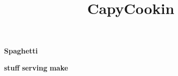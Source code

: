 \documentclass[a4paper,12pt]{article}
\begin{document}
\title{\LARGE CapyCookin}
\maketitle
\begin{center}
\textbf{Spaghetti}\newline
\end{center}
\textbf{stuff}\newline
\textbf{serving}\newline
\textbf{make}\newline
\newline
\end{document}
